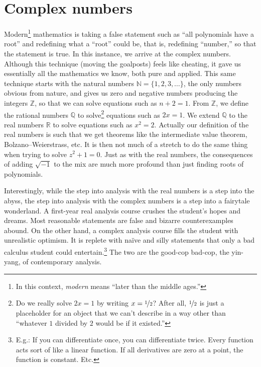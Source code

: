\documentclass[12pt,openany]{book}
\newcommand{\R}{{\mathbb{R}}}
\newcommand{\Z}{{\mathbb{Z}}}
\newcommand{\N}{{\mathbb{N}}}
\newcommand{\Q}{{\mathbb{Q}}}
\newcommand{\myquote}[1]{``#1''}
\theoremstyle{plain}
\theoremstyle{remark}
\theoremstyle{definition}
\theoremstyle{exercise}
\theoremstyle{example}
\begin{document}
\section{Complex numbers} \label{sec:complexnums}

Modern\footnote{In this context, \emph{modern}
means \myquote{later than the middle ages.}}
mathematics
is taking a false statement such as
\myquote{all polynomials have a root} and redefining what a
\myquote{root} could be, that is,
redefining \myquote{number,}
so that the statement is true.
In this instance, we arrive at the complex numbers.
Although this technique (moving the goalposts)
feels like cheating, it gave us
essentially all the mathematics we know, both pure and applied.
This same
technique starts with the natural numbers
$\N = \{ 1,2,3,\ldots \}$, the only
numbers obvious from nature,
and gives us zero and negative numbers producing the integers
$\Z$, so that we can solve equations such as $n+2 = 1$.
From $\Z$, we define the rational numbers
$\Q$ to solve\footnote{%
Do we really solve $2x=1$ by writing $x = \nicefrac{1}{2}$?  After all, 
$\nicefrac{1}{2}$ is just a placeholder for an object that we can't describe
in a way other than
\myquote{whatever $1$ divided by $2$ would be if it existed.}}
equations such as $2x=1$.  We extend
$\Q$ to the real numbers $\R$
to solve equations such as $x^2=2$.  Actually our definition 
of the real numbers is such that we get theorems like the
intermediate value theorem, Bolzano--Weierstrass,
etc.  It is then not much of a stretch to do the same thing when trying
to solve $z^2+1=0$.  Just as with the real numbers,
the consequences of adding $\sqrt{-1}$ to the mix are much more
profound than just finding roots of polynomials.

Interestingly, while the step into analysis with the real numbers
is a step into the abyss, the step into analysis with the complex numbers is a
step into a fairytale wonderland.  A first-year real analysis course
crushes the student's hopes and dreams.  Most reasonable statements
are false and bizarre counterexamples abound.
On the other hand, a complex analysis course fills the student with
unrealistic optimism.  It is replete with na\"ive and silly statements
that only a bad calculus student could entertain.\footnote{%
E.g.:  If you can differentiate once, you can differentiate twice.
Every function acts sort of like a linear function.
If all derivatives are zero at a point, the function is constant.
Etc.}
The two are the good-cop bad-cop, the yin-yang,
of contemporary analysis.
\end{document}

